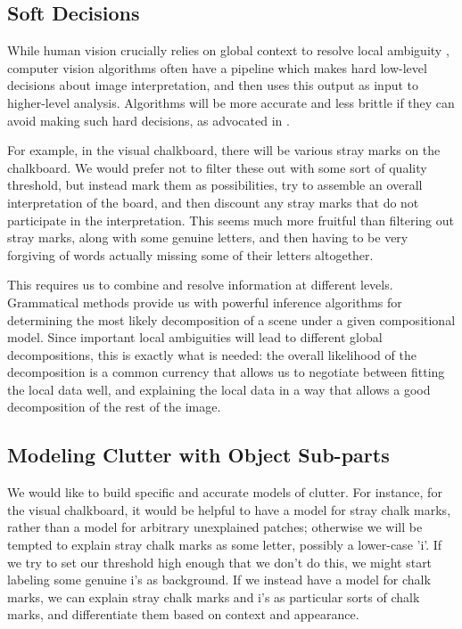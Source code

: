 
\subsection{Soft Decisions}
\label{sec-soft}

While human vision crucially relies on global context to resolve local
ambiguity \cite{visual-context}, computer vision algorithms often have
a pipeline which makes hard low-level decisions about image
interpretation, and then uses this output as input to higher-level
analysis. Algorithms will be more accurate and less brittle if they
can avoid making such hard decisions, as advocated in \cite{pop,
  jin-geman}.

For example, in the visual chalkboard, there will be various stray
marks on the chalkboard. We would prefer not to filter these out with
some sort of quality threshold, but instead mark them as
possibilities, try to assemble an overall interpretation of the board,
and then discount any stray marks that do not participate in the
interpretation. This seems much more fruitful than filtering out stray
marks, along with some genuine letters, and then having to be very
forgiving of words actually missing some of their letters altogether.

This requires us to combine and resolve information at different
levels. Grammatical methods provide us with powerful inference
algorithms for determining the most likely decomposition of a scene
under a given compositional model. Since important local ambiguities
will lead to different global decompositions, this is exactly what is
needed: the overall likelihood of the decomposition is a common
currency that allows us to negotiate between fitting the local data
well, and explaining the local data in a way that allows a good
decomposition of the rest of the image.

\subsection{Modeling Clutter with Object Sub-parts}
\label{sec-clutter}

We would like to build specific and accurate models of clutter.  For
instance, for the visual chalkboard, it would be helpful to have a
model for stray chalk marks, rather than a model for arbitrary
unexplained patches; otherwise we will be tempted to explain stray
chalk marks as some letter, possibly a lower-case 'i'. If we try to
set our threshold high enough that we don't do this, we might start
labeling some genuine i's as background. If we instead have a model
for chalk marks, we can explain stray chalk marks and i's as
particular sorts of chalk marks, and differentiate them based on
context and appearance.

